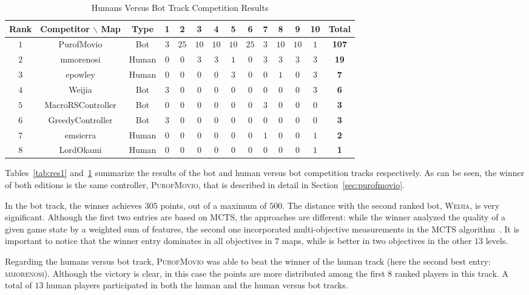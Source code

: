\documentclass[conference]{IEEEtran}
\begin{document}
\begin{table}[!t]
	\centering
	\begin{tabular}{|c|c|c|c|c|c|c|c|c|c|c|c|c|c|}
		\hline	
\textbf{Rank} & \textbf{Competitor} $\backslash$ \textbf{Map}&\textbf{Type}&\textbf{1}&\textbf{2}&\textbf{3}&\textbf{4}&\textbf{5}&\textbf{6}&\textbf{7}&\textbf{8}&\textbf{9}&\textbf{10}&\textbf{Total}\\
		\hline	
$1$&PurofMovio&Bot&$3$&$25$&$10$&$10$&$10$&$25$&$3$&$10$&$10$&$1$&\textbf{107}\\
		\hline	
$2$&mmorenosi&Human&$0$&$0$&$3$&$3$&$1$&$0$&$3$&$3$&$3$&$3$&\textbf{19}\\
		\hline	
$3$&epowley&Human&$0$&$0$&$0$&$0$&$3$&$0$&$0$&$1$&$0$&$3$&\textbf{7}\\
		\hline	
$4$&Weijia&Bot&$3$&$0$&$0$&$0$&$0$&$0$&$0$&$0$&$0$&$3$&\textbf{6}\\
		\hline	
$5$&MacroRSController&Bot&$0$&$0$&$0$&$0$&$0$&$0$&$3$&$0$&$0$&$0$&\textbf{3}\\
		\hline	
$6$&GreedyController&Bot&$3$&$0$&$0$&$0$&$0$&$0$&$0$&$0$&$0$&$0$&\textbf{3}\\
		\hline	
$7$&emsierra&Human&$0$&$0$&$0$&$0$&$0$&$0$&$1$&$0$&$0$&$1$&\textbf{2}\\
		\hline	
$8$&LordOkami&Human&$0$&$0$&$0$&$0$&$0$&$0$&$0$&$0$&$0$&$1$&\textbf{1}\\
		\hline	
	\end{tabular}
	\caption{Humans Versus Bot Track Competition Results}
	\label{tab:res2}
\end{table}

Tables~\ref{tab:res1} and~\ref{tab:res2} summarize the results of the bot and human versus bot competition tracks respectively. As can be seen, the winner of both editions is the same controller, \textsc{PurofMovio}, that is described in detail in Section~\ref{sec:purofmovio}.

In the bot track, the winner achieves $305$ points, out of a maximum of $500$. The distance with the second ranked bot, \textsc{Weijia}, is very significant. Although the first two entries are based on MCTS, the approaches are different: while the winner analyzed the quality of a given game state by a weighted sum of features, the second one incorporated multi-objective measurements in the MCTS algorithm~\cite{Wang13}. It is important to notice that the winner entry dominates in all objectives in $7$ maps, while is better in two objectives in the other $13$ levels.

Regarding the humans versus bot track, \textsc{PurofMovio} was able to beat the winner of the human track (here the second best entry: \textsc{mmorenosi}). Although the victory is clear, in this case the points are more distributed among the first $8$ ranked players in this track. A total of $13$ human players participated in both the human and the human versus bot tracks.
\end{document}
